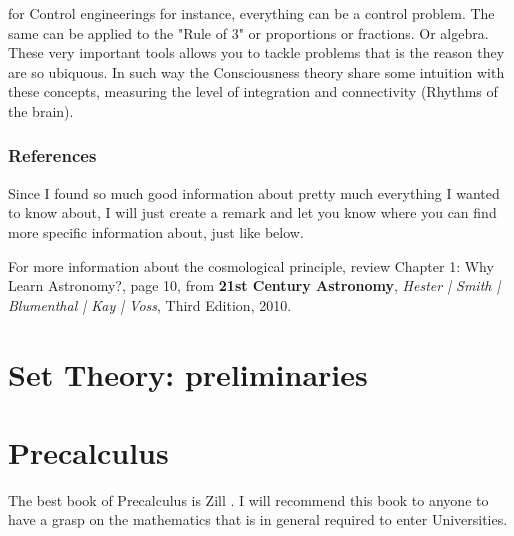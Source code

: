 \documentclass[11pt,fleqn]{book} %
\begin{document}
for Control engineerings for instance, everything can be a control problem.  The same can be applied to the "Rule of 3" or proportions or fractions.  Or algebra.  These very important tools allows you to tackle problems that is the reason they are so ubiquous.  In such way the Consciousness theory share some intuition with these concepts, measuring the level of integration and connectivity (Rhythms of the brain).



\subsection{References}

Since I found so much good information about pretty much everything I wanted to know about, I will just create a remark and let you know where you can find more specific information about, just like below.

\begin{remark}
For more information about the cosmological principle, review Chapter 1: Why Learn Astronomy?, page 10, from \textbf{21st Century Astronomy}, \textit{Hester | Smith | Blumenthal | Kay | Voss}, Third Edition, 2010.
\end{remark}




\chapter{Set Theory: preliminaries}


\chapter{Precalculus}

The best book of Precalculus is Zill \cite{ZillBook}.  I will recommend this book to anyone to have a grasp on the mathematics that is in general required to enter Universities.
\end{document}

